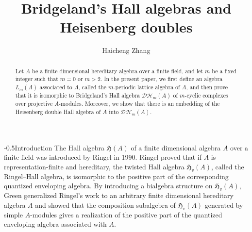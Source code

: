 \documentclass[reqno,12pt]{amsart}
\numberwithin{equation}{section}
\theoremstyle{plain}
\theoremstyle{definition}
\begin{document}
\title[Bridgeland's Hall algebras and Heisenberg doubles]{Bridgeland's Hall algebras and Heisenberg doubles} 

\author[Haicheng Zhang]{{Haicheng Zhang}} 

\address{
Institute of Mathematics, School of Mathematical Sciences, Nanjing Normal University,
 Nanjing 210023, P. R. China.\endgraf
}

\address{
Yau Mathematical Sciences Center, Tsinghua University,
 Beijing 100084, P. R. China.\endgraf
}

\maketitle

\begin{abstract}
Let $A$ be a finite dimensional hereditary algebra over a finite field, and let $m$ be a fixed integer such that $m=0$ or $m>2$. In the present paper, we first define an algebra $L_m(A)$ associated to $A$, called the $m$-periodic lattice algebra of $A$, and then prove that it is isomorphic to Bridgeland's Hall algebra $\mathcal {D}\mathcal {H}_m(A)$ of $m$-cyclic complexes over projective $A$-modules. Moreover, we show that there is an embedding of the Heisenberg double Hall algebra of $A$ into $\mathcal {D}\mathcal {H}_m(A)$.
\end{abstract}

{
  {-\baselineskip}{0.5\baselineskip}{\bf\leftline}}{Introduction}
The Hall algebra $\mathfrak{H}(A)$ of a finite dimensional algebra $A$ over a finite field was introduced by Ringel \cite{R90a} in 1990. Ringel \cite{R90,R90a} proved that if $A$ is representation-finite and hereditary, the twisted Hall algebra $\mathfrak{H}_{v}(A)$, called the Ringel--Hall algebra, is isomorphic to the positive part of the corresponding quantized enveloping algebra.  By introducing a bialgebra structure on $\mathfrak{H}_{v}(A)$,
Green \cite{Gr95} generalized Ringel's work to an arbitrary finite dimensional hereditary algebra $A$
and showed that the composition subalgebra of $\mathfrak{H}_{v}(A)$ generated by simple $A$-modules
gives a realization of the positive part of the quantized enveloping algebra associated with $A$.
\end{document}
